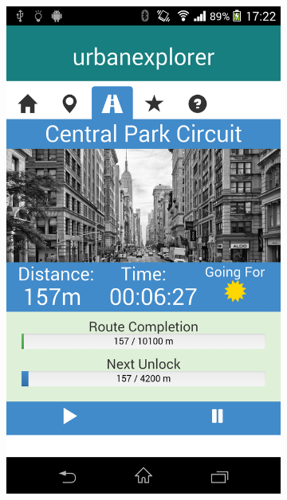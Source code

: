 \documentclass{beamer}
\begin{document}
\begin{frame}
\begin{figure}[h]
\begin{subfigure}[b]{0.3\textwidth}
      \includegraphics[width=\textwidth]{images/run.png}
    \end{subfigure}
  \end{figure}
\end{frame}
\end{document}
